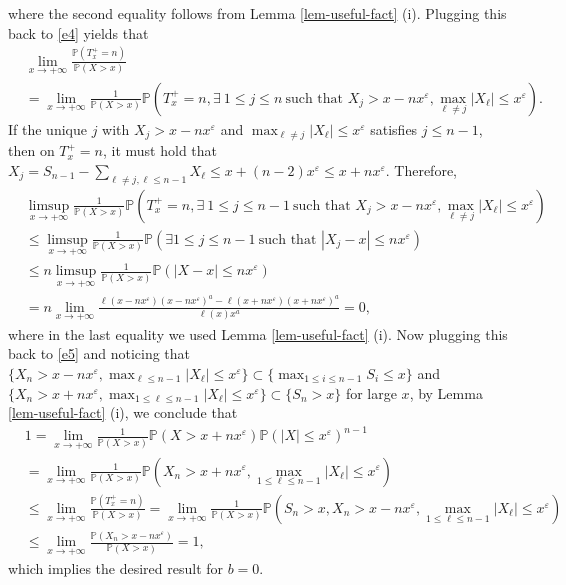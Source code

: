 \documentclass[10pt,a4paper]{amsart}
\numberwithin{equation}{section}
\begin{document}
where the second equality follows from  Lemma \ref{lem-useful-fact} (i). Plugging this back to \eqref{e4} yields that 
\begin{align}\label{e5}
	& \lim_{x\to +\infty} \frac{\mathbb{P}(T_x^+ =n)}{\mathbb{P}(X>x)} \nonumber\\
	&  = \lim_{x\to +\infty} \frac{1}{\mathbb{P}(X>x)} \mathbb{P}\left(T_x^+=n, \exists \ 1\leq j\leq n\ \mbox{such that } X_j>x- nx^\varepsilon, \max_{\ell\neq j} |X_\ell | \leq x^\varepsilon \right). 
\end{align}
If the unique $j$ with $X_j>x-nx^\varepsilon$ and $\max_{\ell\neq j} |X_\ell|\leq x^\varepsilon$ satisfies $j\leq n-1$, then on $T_x^+=n$, it must hold that $X_j = S_{n-1}- \sum_{\ell\neq j ,\ell\leq n-1} X_\ell \leq x+ (n-2)x^\varepsilon\leq x+nx^\varepsilon $.  Therefore, 
\begin{align}\label{e5'}
	& \limsup_{x\to +\infty} \frac{1}{\mathbb{P}(X>x)}\mathbb{P}\left(T_x^+=n, \exists \ 1\leq j\leq n-1\ \mbox{such that } X_j>x- nx^\varepsilon, \max_{\ell\neq j} |X_\ell | \leq x^\varepsilon \right) \nonumber\\
	& \leq \limsup_{x\to +\infty} \frac{1}{\mathbb{P}(X>x)} \mathbb{P}\left( \exists 1\leq j\leq n-1\ \mbox{such that }  |X_j-x|\leq nx^\varepsilon\right) \nonumber\\
	&\leq n  \limsup_{x\to +\infty} \frac{1}{\mathbb{P}(X>x)}\mathbb{P}\left(   |X-x|\leq nx^\varepsilon\right) \nonumber\\
	&= n  \lim_{x\to +\infty} \frac{\ell(x-nx^\varepsilon)(x-nx^\varepsilon)^a-\ell(x+nx^\varepsilon)(x+nx^\varepsilon)^a}{\ell(x)x^a}=0,
\end{align}
where in the last equality we used  Lemma \ref{lem-useful-fact} (i). Now plugging this back to \eqref{e5} and noticing that 
$\{X_n>x- nx^\varepsilon, \max_{\ell \leq n-1} |X_\ell | \leq x^\varepsilon \}\subset  \{ \max_{1\leq i\leq n-1} S_i\leq x\}$ and $\{X_n>x+ nx^\varepsilon, \max_{1\leq \ell \leq n-1} |X_\ell | \leq x^\varepsilon \}\subset  \{ S_n > x\}$  for large $x$, by Lemma \ref{lem-useful-fact} (i), we conclude that 
\begin{align}
	&1= \lim_{x\to +\infty} \frac{1}{\mathbb{P}(X>x)} \mathbb{P}\left(X>x+ nx^\varepsilon\right) \mathbb{P}\left( |X| \leq x^\varepsilon \right)^{n-1}  \nonumber\\
	&= \lim_{x\to +\infty} \frac{1}{\mathbb{P}(X>x)} \mathbb{P}\left(X_n>x+ nx^\varepsilon, \max_{1\leq \ell \leq n-1} |X_\ell | \leq x^\varepsilon \right) \nonumber\\
	&\leq  \lim_{x\to +\infty} \frac{\mathbb{P}(T_x^+ =n)}{\mathbb{P}(X>x)}   = \lim_{x\to +\infty} \frac{1}{\mathbb{P}(X>x)}\mathbb{P}\left(S_n >x, X_n>x- nx^\varepsilon, \max_{1\leq \ell \leq n-1} |X_\ell | \leq x^\varepsilon \right) \nonumber\\
	& \leq  \lim_{x\to +\infty} \frac{\mathbb{P}\left( X_n>x- nx^\varepsilon \right)}{\mathbb{P}(X>x)} =1,
\end{align}
which implies the desired result for $b=0$.
\end{document}
